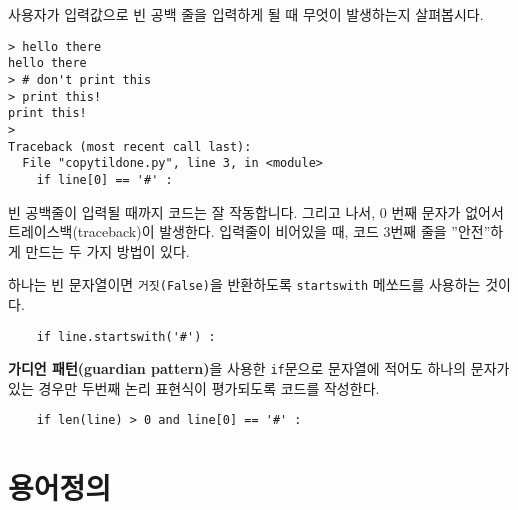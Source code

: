 사용자가 입력값으로 빈 공백 줄을 입력하게 될 때 무엇이 발생하는지 살펴봅시다.

\beforeverb
\begin{verbatim}
> hello there
hello there
> # don't print this
> print this!
print this!
> 
Traceback (most recent call last):
  File "copytildone.py", line 3, in <module>
    if line[0] == '#' :
\end{verbatim}
\afterverb
%
빈 공백줄이 입력될 때까지 코드는 잘 작동합니다. 
그리고 나서, 0 번째 문자가 없어서 트레이스백(traceback)이 발생한다. 
입력줄이 비어있을 때, 코드 3번째 줄을 ''안전''하게 만드는 두 가지 방법이 있다.

하나는 빈 문자열이면 {\tt 거짓(False)}을 반환하도록 {\tt startswith} 메쏘드를 사용하는 것이다.

\beforeverb
\begin{verbatim}
    if line.startswith('#') :
\end{verbatim}
\afterverb
%

{\bf 가디언 패턴(guardian pattern)}을 사용한 {\tt if}문으로 문자열에 적어도 하나의 문자가 있는 경우만 두번째 논리 표현식이 평가되도록 코드를 작성한다.

\beforeverb
\begin{verbatim}
    if len(line) > 0 and line[0] == '#' :
\end{verbatim}
\afterverb
%

\section{    용어정의}

